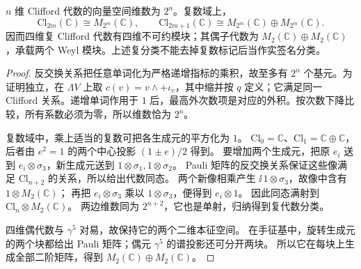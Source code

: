 \begin{proposition}[维数、复矩阵代数与手征分解]
$n$ 维 Clifford 代数的向量空间维数为 $2^n$。复数域上，
\[
 \mathrm{Cl}_{2m}(\mathbb C)\cong M_{2^m}(\mathbb C),\qquad
 \mathrm{Cl}_{2m+1}(\mathbb C)\cong M_{2^m}(\mathbb C)\oplus M_{2^m}(\mathbb C).
\]
因而四维复 Clifford 代数有四维不可约模块；其偶子代数为 $M_2(\mathbb C)\oplus M_2(\mathbb C)$，承载两个 Weyl 模块。上述复分类不能去掉复数标记后当作实签名分类。
\end{proposition}
\begin{proof}
反交换关系把任意单词化为严格递增指标的乘积，故至多有 $2^n$ 个基元。为证明独立，在 $\Lambda V$ 上取 $c(v)=v\wedge+\iota_v$，其中缩并按 $q$ 定义；它满足同一 Clifford 关系。递增单词作用于 $1$ 后，最高外次数项是对应的外积。按次数下降比较，所有系数必须为零，所以维数恰为 $2^n$。

复数域中，乘上适当的复数可把各生成元的平方化为 $1$。
$\mathrm{Cl}_0=\mathbb C$、$\mathrm{Cl}_1=\mathbb C\oplus\mathbb C$，后者由 $e^2=1$ 的两个中心投影 $(1\pm e)/2$ 得到。
要增加两个生成元，把原 $e_i$ 送到 $e_i\otimes\sigma_3$，新生成元送到 $1\otimes\sigma_1,1\otimes\sigma_2$。
Pauli 矩阵的反交换关系保证这些像满足 $\mathrm{Cl}_{n+2}$ 的关系，所以给出代数同态。
两个新像相乘产生 $\ii\,1\otimes\sigma_3$，故像中含有 $1\otimes M_2(\mathbb C)$；
再把 $e_i\otimes\sigma_3$ 乘以 $1\otimes\sigma_3$，便得到 $e_i\otimes1$。
因此同态满射到 $\mathrm{Cl}_n\otimes M_2(\mathbb C)$。
两边维数同为 $2^{n+2}$，它也是单射，归纳得到复代数分类。

四维偶代数与 $\gamma^5$ 对易，故保持它的两个二维本征空间。
在手征基中，旋转生成元的两个块都给出 Pauli 矩阵；偶元 $\gamma^5$ 的谱投影还可分开两块。
所以它在每块上生成全部二阶矩阵，得到 $M_2(\mathbb C)\oplus M_2(\mathbb C)$。
\end{proof}

